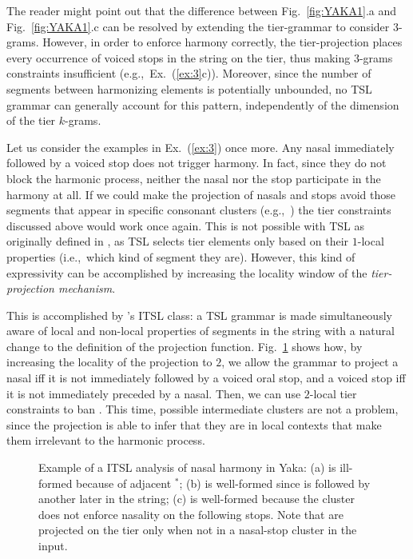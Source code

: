 \documentclass[11pt,a4paper]{article}
\begin{document}
The reader might point out that the difference between Fig.~\ref{fig:YAKA1}.a and Fig.~\ref{fig:YAKA1}.c can be resolved by extending the tier-grammar to consider $3$-grams.
However, in order to enforce harmony correctly, the tier-projection places every occurrence of voiced stops in the string on the tier, thus making $3$-grams constraints insufficient (e.g.,~Ex.~(\ref{ex:3}c)).
Moreover, since the number of segments between harmonizing elements is potentially unbounded, no TSL grammar can generally account for this pattern, independently of the dimension of the tier $k$-grams.

Let us consider the examples in Ex.~(\ref{ex:3}) once more. 
Any nasal immediately followed by a voiced stop does not trigger harmony. 
In fact, since they do not block the harmonic process, neither the nasal nor the stop participate in the harmony at all.
If we could make the projection of nasals and stops avoid  those segments that appear in specific consonant clusters (e.g.,~\textipa{[nd]}) the tier constraints discussed above would work once again.
This is not possible with TSL as originally defined in \cite{HeinzRawalTanner}, as TSL selects tier elements only based on their $1$-local properties (i.e.,~which kind of segment they are). %
However, this kind of expressivity can be accomplished by increasing the locality window of the \emph{tier-projection mechanism}. 

This is accomplished by \citet{desanto2019structure}'s ITSL class: a TSL grammar is made simultaneously aware of local and non-local properties of segments in the string with a natural change to the definition of the projection function.
Fig.~\ref{fig:YAKA2} shows how, by increasing the locality of the projection to $2$, we allow the grammar to project a nasal iff it is not immediately followed by a voiced oral stop, and a voiced stop iff it is not immediately preceded by a nasal.
Then, we can use $2$-local tier constraints to ban  \textipa{[nd]}.
This time,  possible intermediate clusters are not a problem, since the projection is able to infer that they are in local contexts that make them irrelevant to the harmonic process.

\begin{figure}[]
\begin{center}
    \scalebox{0.8}{
       
         
         }
         \scalebox{0.8}{
      
      }
        \end{center}
        \caption{Example of a ITSL analysis of nasal harmony in Yaka: (a) is ill-formed because of adjacent $^*$\textipa{[nd]}; (b) is well-formed since  \textipa{[n]} is followed by another  \textipa{[n]} later in the string; (c) is well-formed because the \textipa{[Ng]} cluster does not enforce nasality on the following stops.  Note that \textipa{[n,d,g,N]} are projected on the tier only when not in a nasal-stop cluster in the input. }
        \label{fig:YAKA2}
        \end{figure}
\end{document}
